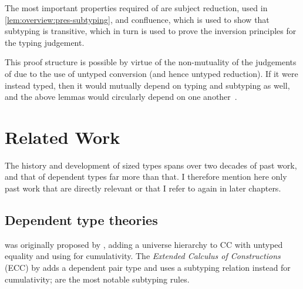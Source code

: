 The most important properties required of \lang are subject reduction,
used in \cref{lem:overview:pres-subtyping},
and confluence, which is used to show that subtyping is transitive,
which in turn is used to prove the inversion principles for the typing judgement.

This proof structure is possible by virtue of the non-mutuality of the judgements of \lang
due to the use of untyped conversion (and hence untyped reduction).
If it were instead typed, then it would mutually depend on typing and subtyping as well,
and the above lemmas would circularly depend on one another~\citep{wjb}. \\

\section{Related Work}

The history and development of sized types spans over two decades of past work,
and that of dependent types far more than that.
I therefore mention here only past work that are directly relevant
or that I refer to again in later chapters.

\subsection{Dependent type theories}

\GCC{}
was originally proposed by \citet{GCC-Coquand},
adding a universe hierarchy to CC with untyped equality
and using  for cumulativity.
The \emph{Extended Calculus of Constructions}
(ECC) by \citet{ECC} adds a dependent pair type
and uses a subtyping relation instead for cumulativity;
 are the most notable subtyping rules.

\vspace{-\baselineskip}

